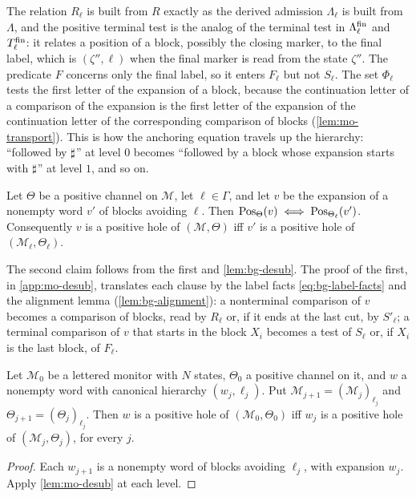 The relation $R_\ell$ is built from $R$ exactly as the derived admission
$\Lambda_\ell$ is built from $\Lambda$, and the positive terminal test is the
analog of the terminal test in $\Lambda^{\mathrm{fin}}_\ell$ and $T^{\mathrm{fin}}_\ell$: it relates a
position of a block, possibly the closing marker, to the final label, which is
$(\zeta'',\ell)$ when the final marker is read from the state $\zeta''$. The predicate $F$ concerns
only the final label, so it enters $F_\ell$ but not $S_\ell$. The set
$\Phi_\ell$ tests the first letter of the expansion of a block, because the
continuation letter of a comparison of the expansion is the first letter of the
expansion of the continuation letter of the corresponding comparison of blocks
(\cref{lem:mo-transport}). This is how the anchoring equation travels up the
hierarchy: ``followed by $\sharp$'' at level $0$ becomes ``followed by a block
whose expansion starts with $\sharp$'' at level $1$, and so on.

\begin{lemma}\label{lem:mo-desub}
Let $\Theta$ be a positive channel on $\mathcal M$, let $\ell\in\Gamma$, and let
$v$ be the expansion of a nonempty word $v'$ of blocks avoiding $\ell$. Then
$\operatorname{Pos}_\Theta(v)\iff\operatorname{Pos}_{\Theta_\ell}(v')$. Consequently $v$ is a positive
hole of $(\mathcal M,\Theta)$ iff $v'$ is a positive hole of
$(\mathcal M_\ell,\Theta_\ell)$.
\end{lemma}

The second claim follows from the first and \cref{lem:bg-desub}. The proof of
the first, in \cref{app:mo-desub}, translates each clause by the label facts
\cref{eq:bg-label-facts} and the alignment lemma (\cref{lem:bg-alignment}): a
nonterminal comparison of $v$ becomes a comparison of blocks, read by $R_\ell$
or, if it ends at the last cut, by $S'_\ell$; a terminal comparison of $v$ that
starts in the block $X_i$ becomes a test of $S_\ell$ or, if $X_i$ is the last
block, of $F_\ell$.

\begin{corollary}\label{cor:mo-tower}
Let $\mathcal M_0$ be a lettered monitor with $N$ states, $\Theta_0$ a positive
channel on it, and $w$ a nonempty word with canonical hierarchy
$(w_j,\ell_j)$. Put $\mathcal M_{j+1}=(\mathcal M_j)_{\ell_j}$ and
$\Theta_{j+1}=(\Theta_j)_{\ell_j}$. Then $w$ is a positive hole of
$(\mathcal M_0,\Theta_0)$ iff $w_j$ is a positive hole of
$(\mathcal M_j,\Theta_j)$, for every $j$.
\end{corollary}

\begin{proof}
Each $w_{j+1}$ is a nonempty word of blocks avoiding $\ell_j$, with expansion
$w_j$. Apply \cref{lem:mo-desub} at each level.
\end{proof}

